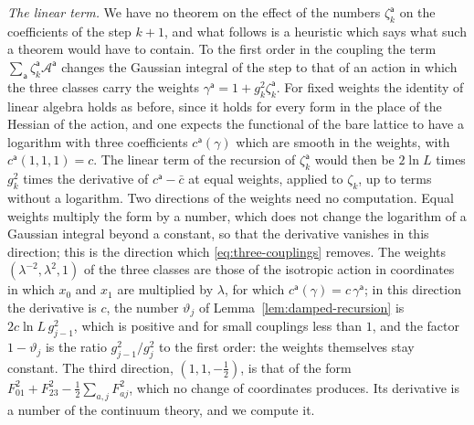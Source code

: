 \documentclass[11pt]{preprint}
\numberwithin{equation}{section}
\theoremstyle{definition}
\theoremstyle{remark}
\theoremstyle{plain}
\begin{document}
\emph{The linear term.} We have no theorem on the effect of the numbers $\zeta^{\mathsf a}_k$ on the coefficients of the step $k + 1$, and what follows is a heuristic which says what such a theorem would have to contain. To the first order in the coupling the term $\sum_{\mathsf a}\zeta^{\mathsf a}_k\mathcal A^{\mathsf a}$ changes the Gaussian integral of the step to that of an action in which the three classes carry the weights $\gamma^{\mathsf a} = 1 + g_k^2\zeta^{\mathsf a}_k$. For fixed weights the identity of linear algebra holds as before, since it holds for every form in the place of the Hessian of the action, and one expects the functional of the bare lattice to have a logarithm with three coefficients $c^{\mathsf a}(\gamma)$ which are smooth in the weights, with $c^{\mathsf a}(1, 1, 1) = c$. The linear term of the recursion of $\zeta^{\mathsf a}_k$ would then be $2\ln L$ times $g_k^2$ times the derivative of $c^{\mathsf a} - \bar c$ at equal weights, applied to $\zeta_k$, up to terms without a logarithm. Two directions of the weights need no computation. Equal weights multiply the form by a number, which does not change the logarithm of a Gaussian integral beyond a constant, so that the derivative vanishes in this direction; this is the direction which \eqref{eq:three-couplings} removes. The weights $(\lambda^{-2}, \lambda^2, 1)$ of the three classes are those of the isotropic action in coordinates in which $x_0$ and $x_1$ are multiplied by $\lambda$, for which $c^{\mathsf a}(\gamma) = c\,\gamma^{\mathsf a}$; in this direction the derivative is $c$, the number $\vartheta_j$ of Lemma~\ref{lem:damped-recursion} is $2c\ln L\,g_{j-1}^2$, which is positive and for small couplings less than $1$, and the factor $1 - \vartheta_j$ is the ratio $g_{j-1}^2/g_j^2$ to the first order: the weights themselves stay constant. The third direction, $(1, 1, -\frac12)$, is that of the form $F_{01}^2 + F_{23}^2 - \frac12\sum_{a,j}F_{aj}^2$, which no change of coordinates produces. Its derivative is a number of the continuum theory, and we compute it.
\end{document}
